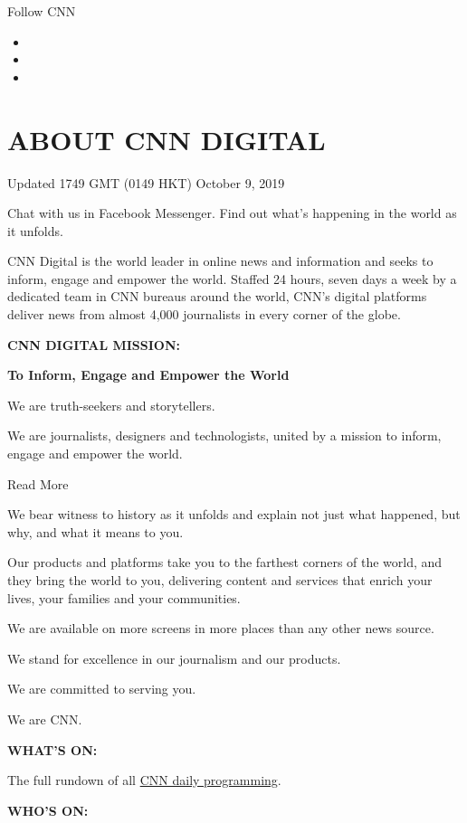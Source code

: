 Follow CNN

\begin{itemize}
\item
\item
\item
\end{itemize}

\hypertarget{about-cnn-digital}{%
\section{ABOUT CNN DIGITAL}\label{about-cnn-digital}}

Updated 1749 GMT (0149 HKT) October 9, 2019

Chat with us in Facebook Messenger. Find out what's happening in the
world as it unfolds.

CNN Digital is the world leader in online news and information and seeks
to inform, engage and empower the world. Staffed 24 hours, seven days a
week by a dedicated team in CNN bureaus around the world, CNN's digital
platforms deliver news from almost 4,000 journalists in every corner of
the globe.

\textbf{CNN DIGITAL MISSION:}

\textbf{To Inform, Engage and Empower the World}

We are truth-seekers and storytellers.

We are journalists, designers and technologists, united by a mission to
inform, engage and empower the world.

Read More

We bear witness to history as it unfolds and explain not just what
happened, but why, and what it means to you.

Our products and platforms take you to the farthest corners of the
world, and they bring the world to you, delivering content and services
that enrich your lives, your families and your communities.

We are available on more screens in more places than any other news
source.

We stand for excellence in our journalism and our products.

We are committed to serving you.

We are CNN.

\textbf{WHAT'S ON:}

The full rundown of all \href{https://www.cnn.com/tv/schedule/cnn}{CNN
daily programming}.

\textbf{WHO'S ON:}

